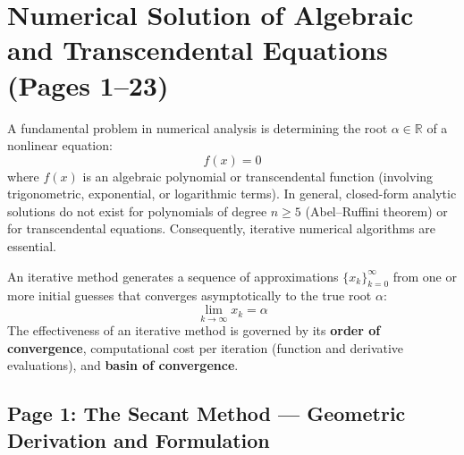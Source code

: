 \chapter{Numerical Solution of Algebraic and Transcendental Equations (Pages 1--23)}
\label{ch:root_finding}

\begin{conceptbox}
A fundamental problem in numerical analysis is determining the root $\alpha \in \mathbb{R}$ of a nonlinear equation:
\begin{equation}
    f(x) = 0
\end{equation}
where $f(x)$ is an algebraic polynomial or transcendental function (involving trigonometric, exponential, or logarithmic terms). In general, closed-form analytic solutions do not exist for polynomials of degree $n \ge 5$ (Abel--Ruffini theorem) or for transcendental equations. Consequently, iterative numerical algorithms are essential.

An iterative method generates a sequence of approximations $\{x_k\}_{k=0}^\infty$ from one or more initial guesses that converges asymptotically to the true root $\alpha$:
\begin{equation}
    \lim_{k \to \infty} x_k = \alpha
\end{equation}
The effectiveness of an iterative method is governed by its \textbf{order of convergence}, computational cost per iteration (function and derivative evaluations), and \textbf{basin of convergence}.
\end{conceptbox}

\section{Page 1: The Secant Method --- Geometric Derivation and Formulation}
\label{sec:page1_secant}

